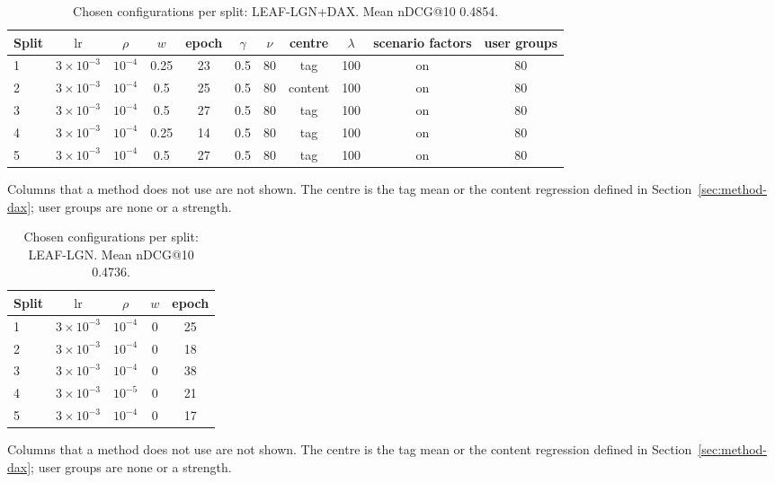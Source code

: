 \documentclass[preprint,12pt,authoryear]{elsarticle}
\begin{document}
\begin{table}[tbp]
\centering
\footnotesize
\caption{Chosen configurations per split: LEAF-LGN+DAX. Mean nDCG@10 0.4854.}
\label{tab:grid00}
\begin{adjustbox}{max width=\linewidth}
\begin{tabular}{lcccccccccc}
\toprule
Split & $\mathrm{lr}$ & $\rho$ & $w$ & epoch & $\gamma$ & $\nu$ & centre & $\lambda$ & scenario factors & user groups \\
\midrule
1 & $3\times10^{-3}$ & $10^{-4}$ & 0.25 & 23 & 0.5 & 80 & tag & 100 & on & 80 \\
2 & $3\times10^{-3}$ & $10^{-4}$ & 0.5 & 25 & 0.5 & 80 & content & 100 & on & 80 \\
3 & $3\times10^{-3}$ & $10^{-4}$ & 0.5 & 27 & 0.5 & 80 & tag & 100 & on & 80 \\
4 & $3\times10^{-3}$ & $10^{-4}$ & 0.25 & 14 & 0.5 & 80 & tag & 100 & on & 80 \\
5 & $3\times10^{-3}$ & $10^{-4}$ & 0.5 & 27 & 0.5 & 80 & tag & 100 & on & 80 \\
\bottomrule
\end{tabular}
\end{adjustbox}
\par\smallskip
\begin{minipage}{\linewidth}\raggedright\footnotesize Columns that a method does not use are not shown. The centre is the tag mean or the content regression defined in Section~\ref{sec:method-dax}; user groups are none or a strength.\end{minipage}
\end{table}

\begin{table}[tbp]
\centering
\footnotesize
\caption{Chosen configurations per split: LEAF-LGN. Mean nDCG@10 0.4736.}
\label{tab:grid01}
\begin{adjustbox}{max width=\linewidth}
\begin{tabular}{lcccc}
\toprule
Split & $\mathrm{lr}$ & $\rho$ & $w$ & epoch \\
\midrule
1 & $3\times10^{-3}$ & $10^{-4}$ & 0 & 25 \\
2 & $3\times10^{-3}$ & $10^{-4}$ & 0 & 18 \\
3 & $3\times10^{-3}$ & $10^{-4}$ & 0 & 38 \\
4 & $3\times10^{-3}$ & $10^{-5}$ & 0 & 21 \\
5 & $3\times10^{-3}$ & $10^{-4}$ & 0 & 17 \\
\bottomrule
\end{tabular}
\end{adjustbox}
\par\smallskip
\begin{minipage}{\linewidth}\raggedright\footnotesize Columns that a method does not use are not shown. The centre is the tag mean or the content regression defined in Section~\ref{sec:method-dax}; user groups are none or a strength.\end{minipage}
\end{table}
\end{document}
